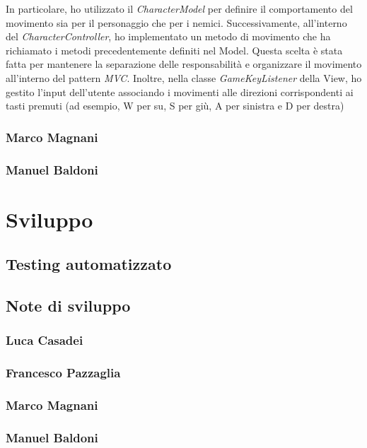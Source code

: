 \documentclass[a4paper,12pt]{report}
\begin{document}
In particolare, ho utilizzato il \textit{CharacterModel} per definire il comportamento del movimento sia per il personaggio che per i nemici. Successivamente, all'interno del \textit{CharacterController}, ho implementato un metodo di movimento che ha richiamato i metodi precedentemente definiti nel Model. Questa scelta è stata fatta per mantenere la separazione delle responsabilità e organizzare il movimento all'interno del pattern \textit{MVC}. Inoltre, nella classe \textit{GameKeyListener} della View, ho gestito l'input dell'utente associando i movimenti alle direzioni corrispondenti ai tasti premuti (ad esempio, W per su, S per giù, A per sinistra e D per destra)


\subsection*{Marco Magnani}

\subsection*{Manuel Baldoni}


\chapter{Sviluppo}

\section{Testing automatizzato}
\section{Note di sviluppo}

\subsection*{Luca Casadei}
\subsection*{Francesco Pazzaglia}
\subsection*{Marco Magnani}
\subsection*{Manuel Baldoni}
\end{document}
